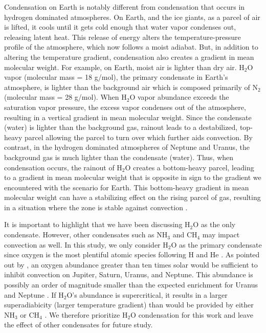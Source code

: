 \documentclass[11pt]{ucscthesisbs}
\begin{document}
Condensation on Earth is notably different from condensation that occurs in hydrogen dominated atmospheres. On Earth, and the ice giants, as a parcel of air is lifted, it cools until it gets cold enough that water vapor condenses out, releasing latent heat. This release of energy alters the temperature-pressure profile of the atmosphere, which now follows a moist adiabat. But, in addition to altering the temperature gradient, condensation also creates a gradient in mean molecular weight. For example, on Earth, moist air is lighter than dry air. H$_{2}$O vapor (molecular mass = 18 g/mol), the primary condensate in Earth's atmosphere, is lighter than the background air which is composed primarily of N$_{2}$ (molecular mass = 28 g/mol). When H$_{2}$O vapor abundance exceeds the saturation vapor pressure, the excess vapor condenses out of the atmosphere, resulting in a vertical gradient in mean molecular weight. Since the condensate (water) is lighter than the background gas, rainout leads to a destabilized, top-heavy parcel allowing the parcel to turn over which further aids convection. By contrast, in the hydrogen dominated atmospheres of Neptune and Uranus, the background gas is much lighter than the condensate (water). Thus, when condensation occurs, the rainout of H$_{2}$O creates a bottom-heavy parcel, leading to a gradient in mean molecular weight that is opposite in sign to the gradient we encountered with the scenario for Earth. This bottom-heavy gradient in mean molecular weight can have a stabilizing effect on the rising parcel of gas, resulting in a situation where the zone is stable against convection \citep{guillot_1995,friedson_2017,leconte_2017}. 

It is important to highlight that we have been discussing H$_{2}$O as the only condensate. However, other condensates such as NH$_{3}$ and CH$_{4}$ may impact convection as well. In this study, we only consider H$_{2}$O as the primary condensate since oxygen is the most plentiful atomic species following H and He \citep{leconte_2017}. As pointed out by \citep{guillot_1995}, an oxygen abundance greater than ten times solar would be sufficient to inhibit convection on Jupiter, Saturn, Uranus, and Neptune. This abundance is possibly an order of magnitude smaller than the expected enrichment for Uranus and Neptune \citep{2016arXiv160604510A}. If H$_{2}$O's abundance is supercritical, it results in a larger superadiabicity (larger temperature gradient) than would be provided by either NH$_{3}$ or CH$_{4}$ \citep{guillot_1995}. We therefore prioritize H$_{2}$O condensation for this work and leave the effect of other condensates for future study. 
\end{document}

